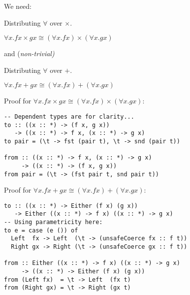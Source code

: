 \documentclass[tikz]{beamer}
\theoremstyle{definition}
\begin{document}
\begin{frame}[fragile]
We need:
\begin{block}{Distributing $\forall$ over $\times$.}
    \begin{center}
        $\forall x. f x \times g x \cong (\forall x. f x) \times (\forall x. g x)$
    \end{center}
\end{block}
and (\em non-trivial)
\begin{block}{Distributing $\forall$ over $+$.}
    \begin{center}
        $\forall x. f x + g x \cong (\forall x. f x) + (\forall x. g x)$
    \end{center}
\end{block}
\end{frame}

\begin{frame}[fragile]
Proof for $\forall x. f x \times g x \cong (\forall x. f x) \times (\forall x. g x)$:
\begin{verbatim}
-- Dependent types are for clarity...
to :: ((x :: *) -> (f x, g x)) 
   -> ((x :: *) -> f x, (x :: *) -> g x)
to pair = (\t -> fst (pair t), \t -> snd (pair t))

from :: ((x :: *) -> f x, (x :: *) -> g x) 
     -> ((x :: *) -> (f x, g x))
from pair = (\t -> (fst pair t, snd pair t))
\end{verbatim}
\end{frame}

\begin{frame}[fragile]
Proof for $\forall x. f x + g x \cong (\forall x. f x) + (\forall x. g x)$:
\begin{verbatim}
to :: ((x :: *) -> Either (f x) (g x)) 
   -> Either ((x :: *) -> f x) ((x :: *) -> g x)
-- Using parametricity here:
to e = case (e ()) of
  Left  fx -> Left  (\t -> (unsafeCoerce fx :: f t))
  Right gx -> Right (\t -> (unsafeCoerce gx :: f t))

from :: Either ((x :: *) -> f x) ((x :: *) -> g x)
     -> ((x :: *) -> Either (f x) (g x))
from (Left fx)  = \t -> Left  (fx t)
from (Right gx) = \t -> Right (gx t)
\end{verbatim}
\end{frame}
\end{document}
